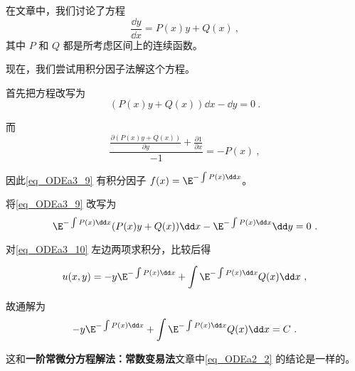\begin{example}{}
在文章中，我们讨论了方程
\begin{equation}
\frac{\dd y}{\dd x}=P(x)y+Q(x)~,
\end{equation}
其中 $P$ 和 $Q$ 都是所考虑区间上的连续函数。

现在，我们尝试用积分因子法解这个方程。

首先把方程改写为
\begin{equation}\label{eq_ODEa3_9}
(P(x)y+Q(x))\dd x-\dd y=0~.
\end{equation}

而
\begin{equation}
\frac{\frac{\partial (P(x)y+Q(x))}{\partial y}+\frac{\partial 1}{\partial x}}{-1}=-P(x)~,
\end{equation}

因此\autoref{eq_ODEa3_9} 有积分因子 $f(x)=\E^{-\int P(x)\dd x}
$。

将\autoref{eq_ODEa3_9} 改写为
\begin{equation}\label{eq_ODEa3_10}
\E^{-\int P(x)\dd x}(P(x)y+Q(x))\dd x-\E^{-\int P(x)\dd x}\dd y=0~.
\end{equation}

对\autoref{eq_ODEa3_10} 左边两项求积分，比较后得

\begin{equation}
u(x, y)=-y\E^{-\int P(x)\dd x}+\int  \E^{-\int P(x)\dd x}Q(x)  \dd x~,
\end{equation}

故通解为
\begin{equation}
-y\E^{-\int P(x)\dd x}+\int  \E^{-\int P(x)\dd x}Q(x)  \dd x=C~.
\end{equation}

这和\textbf{一阶常微分方程解法：常数变易法}文章中\autoref{eq_ODEa2_2} 的结论是一样的。

\end{example}














